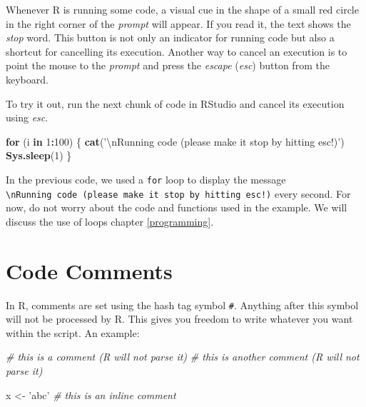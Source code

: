 \documentclass[11pt,]{book}
\newenvironment{Shaded}{\begin{snugshade}}{\end{snugshade}}
\newcommand{\KeywordTok}[1]{\textcolor[rgb]{0.27,0.27,0.27}{\textbf{#1}}}
\newcommand{\DecValTok}[1]{\textcolor[rgb]{0.06,0.06,0.06}{#1}}
\newcommand{\CharTok}[1]{\textcolor[rgb]{0.5,0.5,0.5}{#1}}
\newcommand{\StringTok}[1]{\textcolor[rgb]{0.5,0.5,0.5}{#1}}
\newcommand{\CommentTok}[1]{\textcolor[rgb]{0.56,0.35,0.01}{\textit{#1}}}
\newcommand{\ControlFlowTok}[1]{\textcolor[rgb]{0.13,0.29,0.53}{\textbf{#1}}}
\newcommand{\OperatorTok}[1]{\textcolor[rgb]{0.81,0.36,0.00}{\textbf{#1}}}
\newcommand{\NormalTok}[1]{#1}
\begin{document}
Whenever R is running some code, a visual cue in the shape of a small
red circle in the right corner of the \emph{prompt} will appear. If you
read it, the text shows the \emph{stop} word. This button is not only an
indicator for running code but also a shortcut for cancelling its
execution. Another way to cancel an execution is to point the mouse to
the \emph{prompt} and press the \emph{escape} (\emph{esc}) button from
the keyboard.

To try it out, run the next chunk of code in RStudio and cancel its
execution using \emph{esc}.

\begin{Shaded}
\begin{Highlighting}[]
\ControlFlowTok{for}\NormalTok{ (i }\ControlFlowTok{in} \DecValTok{1}\OperatorTok{:}\DecValTok{100}\NormalTok{) \{}
  \KeywordTok{cat}\NormalTok{(}\StringTok{'}\CharTok{\textbackslash{}n}\StringTok{Running code (please make it stop by hitting esc!)'}\NormalTok{)}
  \KeywordTok{Sys.sleep}\NormalTok{(}\DecValTok{1}\NormalTok{)}
\NormalTok{\}}
\end{Highlighting}
\end{Shaded}

In the previous code, we used a \texttt{for} loop to display the message
\texttt{\textquotesingle{}\textbackslash{}nRunning\ code\ (please\ make\ it\ stop\ by\ hitting\ esc!)\textquotesingle{}}
every second. For now, do not worry about the code and functions used in
the example. We will discuss the use of loops chapter \ref{programming}.

\section{Code Comments}\label{code-comments}

In R, comments are set using the hash tag symbol \texttt{\#}. Anything
after this symbol will not be processed by R. This gives you freedom to
write whatever you want within the script. An example:

\begin{Shaded}
\begin{Highlighting}[]
\CommentTok{# this is a comment (R will not parse it)}
\CommentTok{# this is another comment (R will not parse it)}

\NormalTok{x <-}\StringTok{ 'abc'} \CommentTok{# this is an inline comment }
\end{Highlighting}
\end{Shaded}
\end{document}
